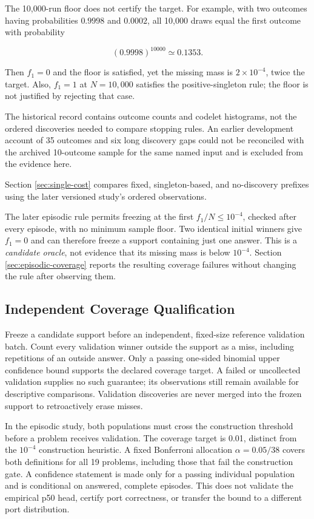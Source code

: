 \documentclass[10pt,letterpaper]{article}
\begin{document}
The 10,000-run floor does not certify the target. For example, with two outcomes having
probabilities \(0.9998\) and \(0.0002\), all 10,000 draws equal the first outcome with
probability

\[
(0.9998)^{10000}\simeq0.1353.
\]

Then \(f_1=0\) and the floor is satisfied, yet the missing mass is \(2\times10^{-4}\),
twice the target. Also, \(f_1=1\) at \(N=10,000\) satisfies the positive-singleton rule;
the floor is not justified by rejecting that case.

The historical record contains outcome counts and codelet histograms, not the ordered
discoveries needed to compare stopping rules. An earlier development account of 35
outcomes and six long discovery gaps could not be reconciled with the archived 10-outcome
sample for the same named input and is excluded from the evidence here.

Section \ref{sec:single-cost} compares fixed, singleton-based, and no-discovery prefixes
using the later versioned study's ordered observations.

The later episodic rule permits freezing at the first \(f_1/N\le10^{-4}\), checked after
every episode, with no minimum sample floor. Two identical initial winners give \(f_1=0\)
and can therefore freeze a support containing just one answer. This is a \emph{candidate
oracle}, not evidence that its missing mass is below \(10^{-4}\). Section
\ref{sec:episodic-coverage} reports the resulting coverage failures without changing the
rule after observing them.

\subsection{Independent Coverage Qualification}\label{sec:qualification}

Freeze a candidate support before an independent, fixed-size reference validation batch.
Count every validation winner outside the support as a miss, including repetitions of an
outside answer. Only a passing one-sided binomial upper confidence bound supports the
declared coverage target. A failed or uncollected validation supplies no such guarantee;
its observations still remain available for descriptive comparisons. Validation
discoveries are never merged into the frozen support to retroactively erase misses.

In the episodic study, both populations must cross the construction threshold before a
problem receives validation. The coverage target is 0.01, distinct from the \(10^{-4}\)
construction heuristic. A fixed Bonferroni allocation \(\alpha=0.05/38\) covers both
definitions for all 19 problems, including those that fail the construction gate. A
confidence statement is made only for a passing individual population and is conditional
on answered, complete episodes. This does not validate the empirical p50 head, certify
port correctness, or transfer the bound to a different port distribution.
\end{document}
